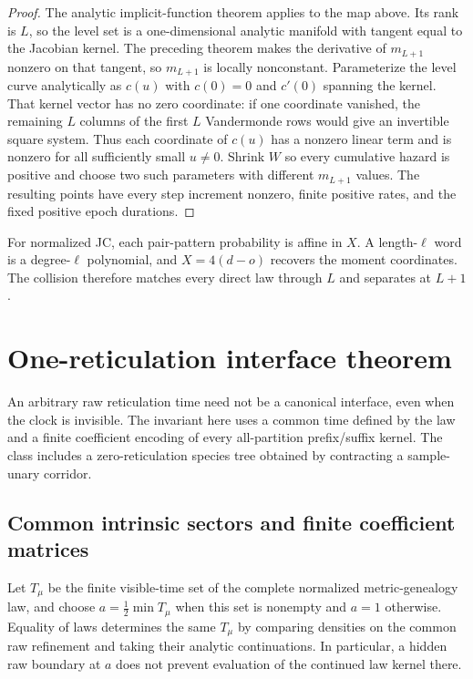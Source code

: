 \documentclass[11pt]{article}
\begin{document}
\begin{proof}
\begingroup
\sloppy
The analytic implicit-function theorem applies to the map above.  Its rank is $L$, so the level set is a one-dimensional analytic manifold with tangent equal to the Jacobian kernel.  The preceding theorem makes the derivative of $m_{L+1}$ nonzero on that tangent, so $m_{L+1}$ is locally nonconstant.  Parameterize the level curve analytically as $c(u)$ with $c(0)=0$ and $c'(0)$ spanning the kernel.  That kernel vector has no zero coordinate: if one coordinate vanished, the remaining $L$ columns of the first $L$ Vandermonde rows would give an invertible square system.  Thus each coordinate of $c(u)$ has a nonzero linear term and is nonzero for all sufficiently small $u\ne0$.  Shrink $W$ so every cumulative hazard is positive and choose two such parameters with different $m_{L+1}$ values.  The resulting points have every step increment nonzero, finite positive rates, and the fixed positive epoch durations.
\endgroup
\end{proof}

For normalized JC, each pair-pattern probability is affine in $X$.  A length-$\ell$ word is a degree-$\ell$ polynomial, and $X=4(d-o)$ recovers the moment coordinates.  The collision therefore matches every direct law through $L$ and separates at $L+1$.

\section{One-reticulation interface theorem}
\label{sec:supp-intrinsic-port}

An arbitrary raw reticulation time need not be a canonical interface, even when the clock is invisible.  The invariant here uses a common time defined by the law and a finite coefficient encoding of every all-partition prefix/suffix kernel.  The class includes a zero-reticulation species tree obtained by contracting a sample-unary corridor.

\subsection{Common intrinsic sectors and finite coefficient matrices}

Let $T_\mu$ be the finite visible-time set of the complete normalized metric-genealogy law, and choose $a=\frac12\min T_\mu$ when this set is nonempty and $a=1$ otherwise.  Equality of laws determines the same $T_\mu$ by comparing densities on the common raw refinement and taking their analytic continuations.  In particular, a hidden raw boundary at $a$ does not prevent evaluation of the continued law kernel there.
\end{document}
